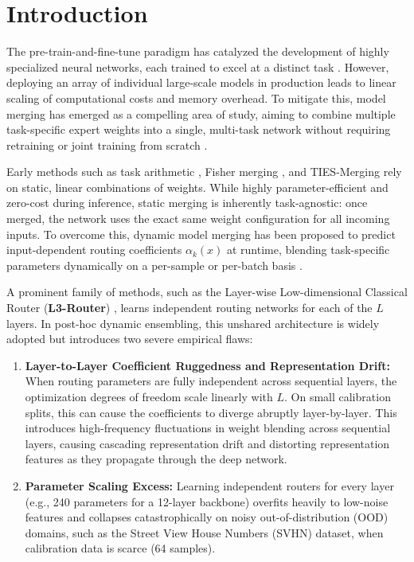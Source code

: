 \section{Introduction}
\label{sec:intro}

The pre-train-and-fine-tune paradigm has catalyzed the development of highly specialized neural networks, each trained to excel at a distinct task \cite{devlin2018bert, radford2019language, vit}. However, deploying an array of individual large-scale models in production leads to linear scaling of computational costs and memory overhead. To mitigate this, model merging has emerged as a compelling area of study, aiming to combine multiple task-specific expert weights into a single, multi-task network without requiring retraining or joint training from scratch \cite{wortsman2022model, task_arithmetic}. 

Early methods such as task arithmetic \cite{task_arithmetic}, Fisher merging \cite{matena2022merging}, and TIES-Merging \cite{yadav2023ties} rely on static, linear combinations of weights. While highly parameter-efficient and zero-cost during inference, static merging is inherently task-agnostic: once merged, the network uses the exact same weight configuration for all incoming inputs. To overcome this, dynamic model merging has been proposed to predict input-dependent routing coefficients $\alpha_k(x)$ at runtime, blending task-specific parameters dynamically on a per-sample or per-batch basis \cite{routing_soup}.

A prominent family of methods, such as the Layer-wise Low-dimensional Classical Router (\textbf{L3-Router}) \cite{l3_router_orig}, learns independent routing networks for each of the $L$ layers. In post-hoc dynamic ensembling, this unshared architecture is widely adopted but introduces two severe empirical flaws:
\begin{enumerate}
    \item \textbf{Layer-to-Layer Coefficient Ruggedness and Representation Drift:} When routing parameters are fully independent across sequential layers, the optimization degrees of freedom scale linearly with $L$. On small calibration splits, this can cause the coefficients to diverge abruptly layer-by-layer. This introduces high-frequency fluctuations in weight blending across sequential layers, causing cascading representation drift and distorting representation features as they propagate through the deep network.
    \item \textbf{Parameter Scaling Excess:} Learning independent routers for every layer (e.g., 240 parameters for a 12-layer backbone) overfits heavily to low-noise features and collapses catastrophically on noisy out-of-distribution (OOD) domains, such as the Street View House Numbers (SVHN) dataset, when calibration data is scarce (64 samples).
\end{enumerate}

